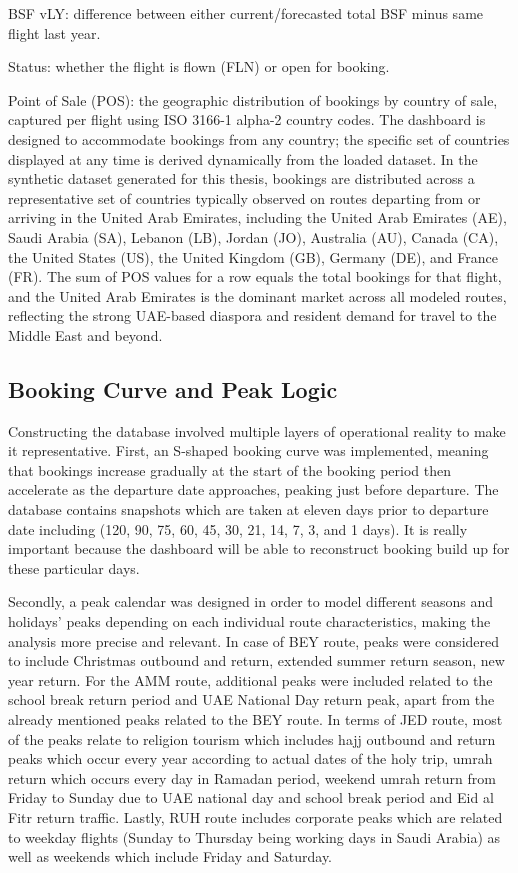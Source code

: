 BSF vLY: difference between either current/forecasted total BSF minus same flight last year.

Status: whether the flight is flown (FLN) or open for booking.

Point of Sale (POS): the geographic distribution of bookings by country of sale, captured per flight using ISO 3166-1 alpha-2 country codes. The dashboard is designed to accommodate bookings from any country; the specific set of countries displayed at any time is derived dynamically from the loaded dataset. In the synthetic dataset generated for this thesis, bookings are distributed across a representative set of countries typically observed on routes departing from or arriving in the United Arab Emirates, including the United Arab Emirates (AE), Saudi Arabia (SA), Lebanon (LB), Jordan (JO), Australia (AU), Canada (CA), the United States (US), the United Kingdom (GB), Germany (DE), and France (FR). The sum of POS values for a row equals the total bookings for that flight, and the United Arab Emirates is the dominant market across all modeled routes, reflecting the strong UAE-based diaspora and resident demand for travel to the Middle East and beyond.

\subsection{Booking Curve and Peak Logic}

Constructing the database involved multiple layers of operational reality to make it representative. First, an S-shaped booking curve was implemented, meaning that bookings increase gradually at the start of the booking period then accelerate as the departure date approaches, peaking just before departure. The database contains snapshots which are taken at eleven days prior to departure date including (120, 90, 75, 60, 45, 30, 21, 14, 7, 3, and 1 days). It is really important because the dashboard will be able to reconstruct booking build up for these particular days.

Secondly, a peak calendar was designed in order to model different seasons and holidays' peaks depending on each individual route characteristics, making the analysis more precise and relevant. In case of BEY route, peaks were considered to include Christmas outbound and return, extended summer return season, new year return. For the AMM route, additional peaks were included related to the school break return period and UAE National Day return peak, apart from the already mentioned peaks related to the BEY route. In terms of JED route, most of the peaks relate to religion tourism which includes hajj outbound and return peaks which occur every year according to actual dates of the holy trip, umrah return which occurs every day in Ramadan period, weekend umrah return from Friday to Sunday due to UAE national day and school break period and Eid al Fitr return traffic. Lastly, RUH route includes corporate peaks which are related to weekday flights (Sunday to Thursday being working days in Saudi Arabia) as well as weekends which include Friday and Saturday.

